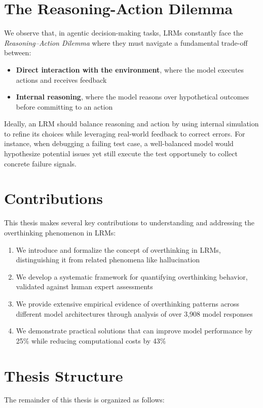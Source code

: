 \section{The Reasoning-Action Dilemma}
We observe that, in agentic decision-making tasks, LRMs constantly face the \emph{Reasoning–Action Dilemma} where they must navigate a fundamental trade-off between:
\begin{itemize}
    \item \textbf{Direct interaction with the environment}, where the model executes actions and receives feedback
    \item \textbf{Internal reasoning}, where the model reasons over hypothetical outcomes before committing to an action
\end{itemize}

Ideally, an LRM should balance reasoning and action by using internal simulation to refine its choices while leveraging real-world feedback to correct errors. For instance, when debugging a failing test case, a well-balanced model would hypothesize potential issues yet still execute the test opportunely to collect concrete failure signals.

\section{Contributions}
This thesis makes several key contributions to understanding and addressing the overthinking phenomenon in LRMs:

\begin{enumerate}
    \item We introduce and formalize the concept of overthinking in LRMs, distinguishing it from related phenomena like hallucination
    \item We develop a systematic framework for quantifying overthinking behavior, validated against human expert assessments
    \item We provide extensive empirical evidence of overthinking patterns across different model architectures through analysis of over 3,908 model responses
    \item We demonstrate practical solutions that can improve model performance by 25\% while reducing computational costs by 43\%
\end{enumerate}

\section{Thesis Structure}
The remainder of this thesis is organized as follows:

